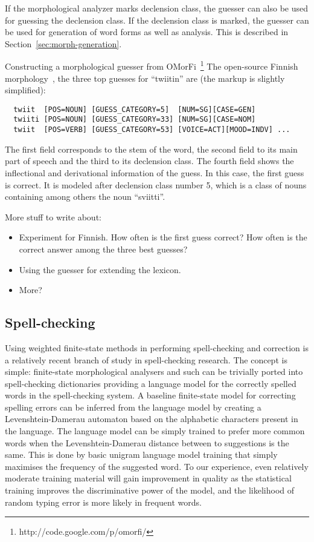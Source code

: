 \documentclass{llncs}
\begin{document}
If the morphological analyzer marks declension class, the guesser can
also be used for guessing the declension class. If the declension
class is marked, the guesser can be used for generation of word forms
as well as analysis. This is described in
Section~\ref{sec:morph-generation}.

Constructing a morphological guesser from
OMorFi~\footnote{http://code.google.com/p/omorfi/} The open-source
Finnish morphology~\cite{pirinen/2008}, the three top guesses for
``twiitin'' are (the markup is slightly simplified): \small
\begin{verbatim}
  twiit  [POS=NOUN] [GUESS_CATEGORY=5]  [NUM=SG][CASE=GEN]
  twiiti [POS=NOUN] [GUESS_CATEGORY=33] [NUM=SG][CASE=NOM]
  twiit  [POS=VERB] [GUESS_CATEGORY=53] [VOICE=ACT][MOOD=INDV] ...
\end{verbatim}
\normalsize
The first field corresponds to the stem of the word, the second field
to its main part of speech and the third to its declension class. The
fourth field shows the inflectional and derivational information of
the guess. In this case, the first guess is correct. It is modeled
after declension class number 5, which is a class of nouns containing
among others the noun ``sviitti''.


More stuff to write about:
\begin{itemize}
\item Experiment for Finnish. How often is the first guess correct?
  How often is the correct answer among the three best guesses?
\item Using the guesser for extending the lexicon.
\item More?
\end{itemize}

\subsection{Spell-checking}

Using weighted finite-state methods in performing spell-checking and correction 
is a relatively recent branch of study in spell-checking research. The concept
is simple: finite-state morphological analysers and such can be trivially ported
into spell-checking dictionaries providing a language model for the correctly
spelled words in the spell-checking system. A baseline finite-state model for
correcting spelling errors can be inferred from the language model by creating
a Levenshtein-Damerau automaton based on the alphabetic characters present in
the language. The language model can be simply trained to prefer more common
words when the Levenshtein-Damerau distance between to suggestions is the same.
This is done by basic unigram language model training that simply maximises
the frequency of the suggested word. To our experience, even relatively moderate
training material will gain improvement in quality as the statistical training
improves the discriminative power of the model, and the likelihood of random
typing error is more likely in frequent words.
\end{document}
